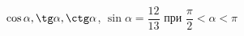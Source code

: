 \begin{ex}[type=simplify_calculate]
	\begin{condition}
		\( \cos\alpha, \tg\alpha, \ctg\alpha \), \quad \( \sin\alpha=\dfrac{12}{13} \) при \( \dfrac{\pi}{2}<\alpha<\pi \)
	\end{condition}
\end{ex}